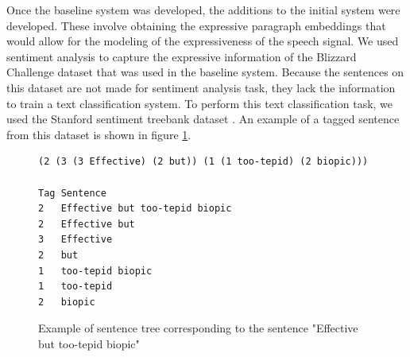 Once the baseline system was developed, the additions to the initial system were developed. These involve obtaining the expressive paragraph embeddings that would allow for the modeling of the expressiveness of the speech signal. We used sentiment analysis to capture the expressive information of the Blizzard Challenge dataset that was used in the baseline system. Because the sentences on this dataset are not made for sentiment analysis task, they lack the information to train a text classification system. To perform this text classification task, we used the Stanford sentiment treebank dataset \cite{socher2013recursive}. An example of a tagged sentence from this dataset is shown in figure \ref{fig:tree}.

\begin{figure}[h]
    \begin{lstlisting}[basicstyle=\small,frame=single]
(2 (3 (3 Effective) (2 but)) (1 (1 too-tepid) (2 biopic)))

Tag Sentence
2   Effective but too-tepid biopic
2   Effective but
3   Effective
2   but
1   too-tepid biopic
1   too-tepid
2   biopic
    \end{lstlisting}
    \label{fig:tree}
    \caption{Example of sentence tree corresponding to the sentence "Effective but too-tepid biopic"}
\end{figure}


